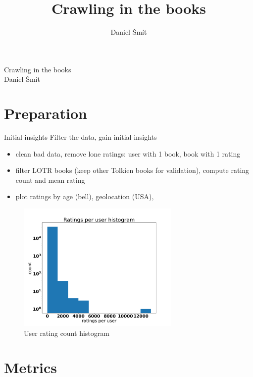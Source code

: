 \documentclass[9pt]{beamer}
\author{Daniel \v{S}m\'{i}t}
\title{Crawling in the books}
\begin{document}
\begin{frame}{}
	\centering\Large
	\vspace{1em}
	{Crawling in the books\\}
	\vspace{1em}
	{Daniel \v{S}m\'{i}t\\}
	\vspace{1em}
\end{frame}

\section{Preparation}

\begin{frame}{Initial insights}
	Filter the data, gain initial insights
	\begin{itemize}
		\item clean bad data, remove lone ratings: user with 1 book, book with 1 rating
		\item filter LOTR books (keep other Tolkien books for validation), compute rating count and mean rating
		\item plot ratings by age (bell), geolocation (USA), 
	\end{itemize}
	\begin{figure}
		\centering
		\includegraphics[width=0.7\textwidth]{../img/user-hist.png}
		\caption{User rating count histogram}
	\end{figure}
\end{frame}

\section{Metrics}
\end{document}
